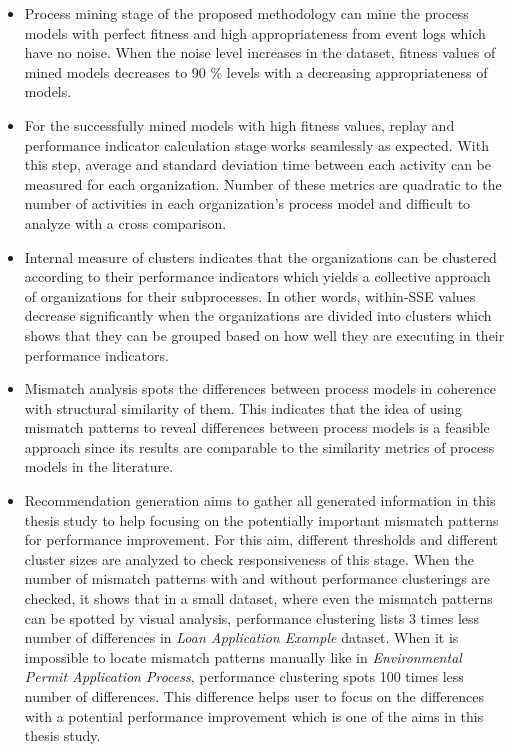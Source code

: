 \begin{itemize}
	\item Process mining stage of the proposed methodology can mine the process models with perfect fitness and high appropriateness from event logs which have no noise. When the noise level increases in the dataset, fitness values of mined models decreases to 90 \% levels with a decreasing appropriateness of models.
	\item For the successfully mined models with high fitness values, replay and performance indicator calculation stage works seamlessly as expected. With this step, average and standard deviation time between each activity can be measured for each organization. Number of these metrics are quadratic to the number of activities in each organization's process model and difficult to analyze with a cross comparison.
	\item Internal measure of clusters indicates that the organizations can be clustered according to their performance indicators which yields a collective approach of organizations for their subprocesses. In other words, within-SSE values decrease significantly when the organizations are divided into clusters which shows that they can be grouped based on how well they are executing in their performance indicators.
	\item Mismatch analysis spots the differences between process models in coherence with structural similarity of them. This indicates that the idea of using mismatch patterns to reveal differences between process models is a feasible approach since its results are comparable to the similarity metrics of process models in the literature.
	\item Recommendation generation aims to gather all generated information in this thesis study to help focusing on the potentially important mismatch patterns for performance improvement. For this aim, different thresholds and different cluster sizes are analyzed to check responsiveness of this stage. When the number of mismatch patterns with and without performance clusterings are checked, it shows that in a small dataset, where even the mismatch patterns can be spotted by visual analysis, performance clustering lists 3 times less number of differences in \textit{Loan Application Example} dataset. When it is impossible to locate mismatch patterns manually like in \textit{Environmental Permit Application Process}, performance clustering spots 100 times less number of differences. This difference helps user to focus on the differences with a potential performance improvement which is one of the aims in this thesis study.

\end{itemize}

